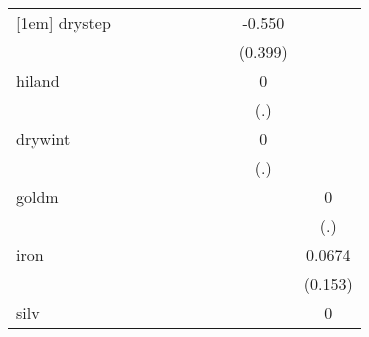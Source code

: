 {\begin{tabular}{l*{9}{c}}
[1em]
drystep     &                     &                     &                     &                     &                     &                     &                     &      -0.550         &                     \\
            &                     &                     &                     &                     &                     &                     &                     &     (0.399)         &                     \\
[1em]
hiland      &                     &                     &                     &                     &                     &                     &                     &           0         &                     \\
            &                     &                     &                     &                     &                     &                     &                     &         (.)         &                     \\
[1em]
drywint     &                     &                     &                     &                     &                     &                     &                     &           0         &                     \\
            &                     &                     &                     &                     &                     &                     &                     &         (.)         &                     \\
[1em]
goldm       &                     &                     &                     &                     &                     &                     &                     &                     &           0         \\
            &                     &                     &                     &                     &                     &                     &                     &                     &         (.)         \\
[1em]
iron        &                     &                     &                     &                     &                     &                     &                     &                     &      0.0674         \\
            &                     &                     &                     &                     &                     &                     &                     &                     &     (0.153)         \\
[1em]
silv        &                     &                     &                     &                     &                     &                     &                     &                     &           0         \\

\end{tabular}}
